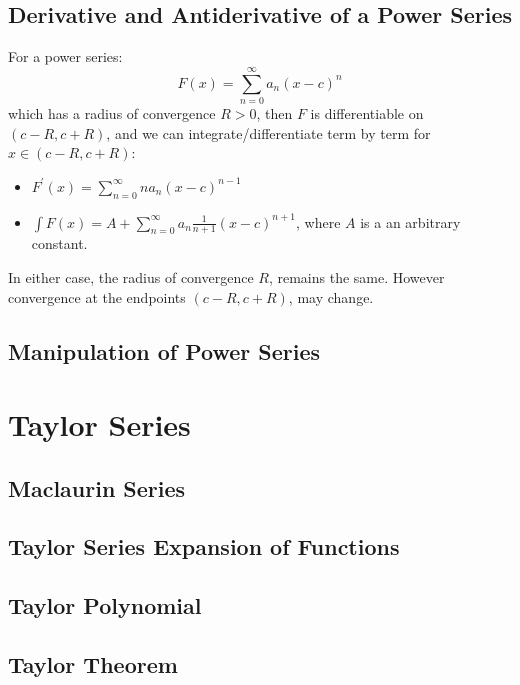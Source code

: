 \documentclass[a4paper]{article}
\begin{document}
  \subsection{Derivative and Antiderivative of a Power Series}
  For a power series:
  \[
    F(x) = \sum_{n=0}^\infty a_n (x-c)^n
  \]
  which has a radius of convergence $R>0$, then $F$ is differentiable on $(c-R, c+R)$, and we can integrate/differentiate term by term for $x \in (c-R,c+R)$:
  \begin{itemize}
    \item $F^\prime (x) = \sum_{n=0}^\infty n a_n(x-c)^{n-1}$
    \item $\int F (x) = A + \sum_{n=0}^\infty a_n \displaystyle\frac{1}{n+1}(x-c)^{n+1}$, where $A$ is a an arbitrary constant.
  \end{itemize}
  In either case, the radius of convergence $R$, remains the same. However convergence at the endpoints $(c-R, c+R)$, may change.
  \subsection{Manipulation of Power Series}
  \section{Taylor Series} 
  \subsection{Maclaurin Series}
  \subsection{Taylor Series Expansion of Functions}
  \subsection{Taylor Polynomial}
  \subsection{Taylor Theorem}
\end{document}
